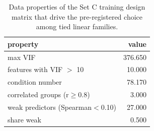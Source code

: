 \begin{table}[t]
\centering
\small
\caption{Data properties of the Set C training design matrix that drive the pre-registered choice among tied linear families.}
\label{tab:table_S08_training_design_properties}
\begin{tabular}{lr}
\toprule
property & value \\
\midrule
max VIF & 376.650 \\
features with VIF $>$ 10 & 10.000 \\
condition number & 78.170 \\
correlated groups (\textbar{}r\textbar{}$\geq$0.8) & 3.000 \\
weak predictors (\textbar{}Spearman\textbar{}$<$0.10) & 27.000 \\
share weak & 0.500 \\
\bottomrule
\end{tabular}
\end{table}
